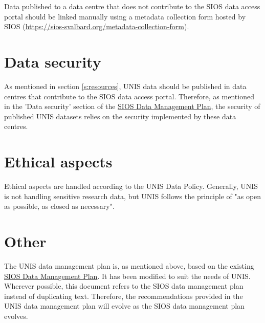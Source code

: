 \documentclass[a4paper,english, 11pt]{article}
\begin{document}
Data published to a data centre that does not contribute to the SIOS data access portal should be linked manually using a metadata collection form hosted by SIOS (\url{https://sios-svalbard.org/metadata-collection-form}).  

\section{Data security}
\label{s:security}

As mentioned in section \ref{s:resources}, UNIS data should be published in data centres that contribute to the SIOS data access portal. Therefore, as mentioned in the 'Data security' section of the \href{https://sios-svalbard.org/sites/sios-svalbard.org/files/common/SIOS_Data_Management_Plan.pdf}{SIOS Data Management Plan}, the security of published UNIS datasets relies on the security implemented by these data centres.

\section{Ethical aspects}
\label{s:ethics}

Ethical aspects are handled according to the UNIS Data Policy. Generally, UNIS is not handling sensitive research data, but UNIS follows the principle of "as open as possible, as closed as necessary".

\section{Other}
\label{s:other}

The UNIS data management plan is, as mentioned above, based on the existing \href{https://sios-svalbard.org/sites/sios-svalbard.org/files/common/SIOS_Data_Management_Plan.pdf}{SIOS Data Management Plan}. It has been modified to suit the needs of UNIS. Wherever possible, this document refers to the SIOS data management plan instead of duplicating text. Therefore, the recommendations provided in the UNIS data management plan will evolve as the SIOS data management plan evolves. 
\end{document}
